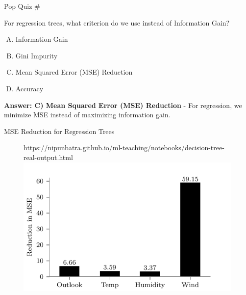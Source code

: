 \documentclass[usenames,dvipsnames]{beamer}
\newcounter{popquiz}
\begin{document}
\begin{frame}{Pop Quiz \#\thepopquiz}
\begin{tcolorbox}[colback=blue!5!white,colframe=blue!75!black,title=Quick Question!]
For regression trees, what criterion do we use instead of Information Gain?
\begin{enumerate}[A)]
\item Information Gain
\item Gini Impurity
\item Mean Squared Error (MSE) Reduction
\item Accuracy
\end{enumerate}
\pause
\textbf{Answer: C) Mean Squared Error (MSE) Reduction} - For regression, we minimize MSE instead of maximizing information gain.
\end{tcolorbox}
\end{frame}

\begin{frame}{MSE Reduction for Regression Trees}

	\begin{figure}[htp]
		\centering
		\begin{notebookbox}{https://nipunbatra.github.io/ml-teaching/notebooks/decision-tree-real-output.html}
		  \includegraphics[width=\linewidth]{../assets/decision-trees/figures/discrete-input-real-output-level-1.pdf}
		\end{notebookbox}
	  \end{figure}

\end{frame}
\end{document}
